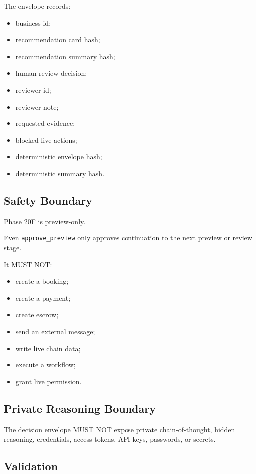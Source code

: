 The envelope records:

\begin{itemize}
  \item business id;
  \item recommendation card hash;
  \item recommendation summary hash;
  \item human review decision;
  \item reviewer id;
  \item reviewer note;
  \item requested evidence;
  \item blocked live actions;
  \item deterministic envelope hash;
  \item deterministic summary hash.
\end{itemize}

\subsection{Safety Boundary}

Phase 20F is preview-only.

Even \texttt{approve\_preview} only approves continuation to the next preview or review stage.

It MUST NOT:

\begin{itemize}
  \item create a booking;
  \item create a payment;
  \item create escrow;
  \item send an external message;
  \item write live chain data;
  \item execute a workflow;
  \item grant live permission.
\end{itemize}

\subsection{Private Reasoning Boundary}

The decision envelope MUST NOT expose private chain-of-thought, hidden reasoning, credentials, access tokens, API keys, passwords, or secrets.

\subsection{Validation}

